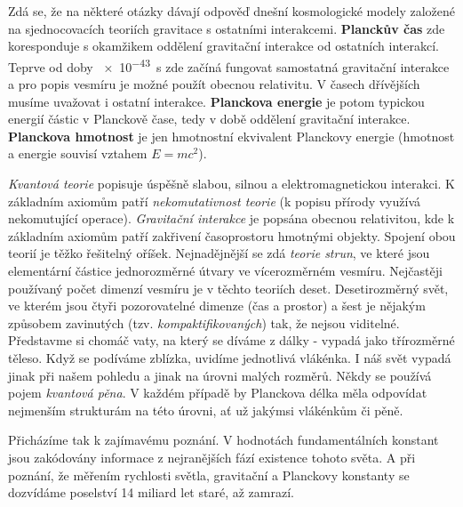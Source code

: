       Zdá se, že na některé otázky dávají odpověď dnešní kosmologické modely založené na
      sjednocovacích teoriích gravitace s ostatními interakcemi. \textbf{Planckův čas} zde
      koresponduje s okamžikem oddělení gravitační interakce od ostatních interakcí. Teprve od doby
      \qty{e-43}{\s} zde začíná fungovat samostatná gravitační interakce a pro popis vesmíru je možné
      použít obecnou relativitu. V časech dřívějších musíme uvažovat i ostatní interakce.
      \textbf{Planckova energie} je potom typickou energií částic v Planckově čase, tedy v době
      oddělení gravitační interakce. \textbf{Planckova hmotnost} je jen hmotnostní ekvivalent
      Planckovy energie (hmotnost a energie souvisí vztahem \(E = mc^2\)).
      
      \emph{Kvantová teorie} popisuje úspěšně slabou, silnou a elektromagnetickou interakci. K
      základním axiomům patří \emph{nekomutativnost teorie} (k popisu přírody využívá nekomutující
      operace). \emph{Gravitační interakce} je popsána obecnou relativitou, kde k základním axiomům
      patří zakřivení časoprostoru hmotnými objekty. Spojení obou teorií je těžko řešitelný oříšek.
      Nejnadějnější se zdá \emph{teorie strun}, ve které jsou elementární částice jednorozměrné
      útvary ve vícerozměrném vesmíru. Nejčastěji používaný počet dimenzí vesmíru je v těchto
      teoriích deset. Desetirozměrný svět, ve kterém jsou čtyři pozorovatelné dimenze (čas a
      prostor) a šest je nějakým způsobem zavinutých (tzv. \emph{kompaktifikovaných}) tak, že nejsou
      viditelné. Představme si chomáč vaty, na který se díváme z dálky - vypadá jako třírozměrné
      těleso. Když se podíváme zblízka, uvidíme jednotlivá vlákénka. I náš svět vypadá jinak při
      našem pohledu a jinak na úrovni malých rozměrů. Někdy se používá pojem \emph{kvantová pěna}. V
      každém případě by Planckova délka měla odpovídat nejmenším strukturám na této úrovni, ať už
      jakýmsi vlákénkům či pěně.
      
      Přicházíme tak k zajímavému poznání. V hodnotách fundamentálních konstant jsou zakódovány
      informace z nejranějších fází existence tohoto světa. A při poznání, že měřením rychlosti
      světla, gravitační a Planckovy konstanty se dozvídáme poselství 14 miliard let staré, až
      zamrazí.

      
